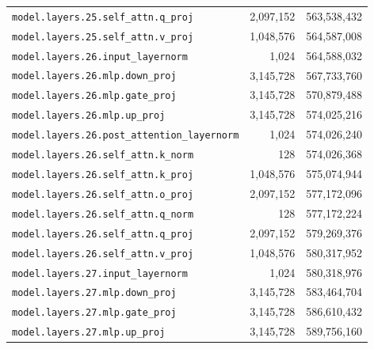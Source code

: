 \documentclass[10pt,a4paper]{article}
\theoremstyle{definition}
\begin{document}
\begin{appendices}
\begin{longtable}{p{9.5cm}rr}
\texttt{model.\allowbreak{}layers.\allowbreak{}25.\allowbreak{}self\_attn.\allowbreak{}q\_proj} & 2,097,152 & 563,538,432 \\
\texttt{model.\allowbreak{}layers.\allowbreak{}25.\allowbreak{}self\_attn.\allowbreak{}v\_proj} & 1,048,576 & 564,587,008 \\
\texttt{model.\allowbreak{}layers.\allowbreak{}26.\allowbreak{}input\_layernorm} & 1,024 & 564,588,032 \\
\texttt{model.\allowbreak{}layers.\allowbreak{}26.\allowbreak{}mlp.\allowbreak{}down\_proj} & 3,145,728 & 567,733,760 \\
\texttt{model.\allowbreak{}layers.\allowbreak{}26.\allowbreak{}mlp.\allowbreak{}gate\_proj} & 3,145,728 & 570,879,488 \\
\texttt{model.\allowbreak{}layers.\allowbreak{}26.\allowbreak{}mlp.\allowbreak{}up\_proj} & 3,145,728 & 574,025,216 \\
\texttt{model.\allowbreak{}layers.\allowbreak{}26.\allowbreak{}post\_attention\_layernorm} & 1,024 & 574,026,240 \\
\texttt{model.\allowbreak{}layers.\allowbreak{}26.\allowbreak{}self\_attn.\allowbreak{}k\_norm} & 128 & 574,026,368 \\
\texttt{model.\allowbreak{}layers.\allowbreak{}26.\allowbreak{}self\_attn.\allowbreak{}k\_proj} & 1,048,576 & 575,074,944 \\
\texttt{model.\allowbreak{}layers.\allowbreak{}26.\allowbreak{}self\_attn.\allowbreak{}o\_proj} & 2,097,152 & 577,172,096 \\
\texttt{model.\allowbreak{}layers.\allowbreak{}26.\allowbreak{}self\_attn.\allowbreak{}q\_norm} & 128 & 577,172,224 \\
\texttt{model.\allowbreak{}layers.\allowbreak{}26.\allowbreak{}self\_attn.\allowbreak{}q\_proj} & 2,097,152 & 579,269,376 \\
\texttt{model.\allowbreak{}layers.\allowbreak{}26.\allowbreak{}self\_attn.\allowbreak{}v\_proj} & 1,048,576 & 580,317,952 \\
\texttt{model.\allowbreak{}layers.\allowbreak{}27.\allowbreak{}input\_layernorm} & 1,024 & 580,318,976 \\
\texttt{model.\allowbreak{}layers.\allowbreak{}27.\allowbreak{}mlp.\allowbreak{}down\_proj} & 3,145,728 & 583,464,704 \\
\texttt{model.\allowbreak{}layers.\allowbreak{}27.\allowbreak{}mlp.\allowbreak{}gate\_proj} & 3,145,728 & 586,610,432 \\
\texttt{model.\allowbreak{}layers.\allowbreak{}27.\allowbreak{}mlp.\allowbreak{}up\_proj} & 3,145,728 & 589,756,160 \\

\end{longtable}
\end{appendices}
\end{document}
